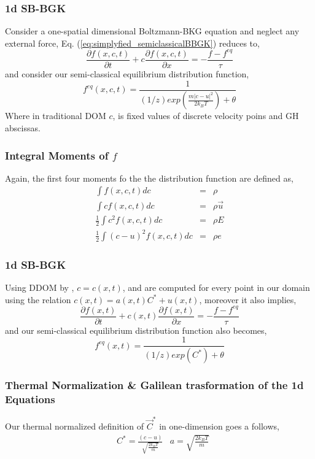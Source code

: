\begin{frame}
	\frametitle{1d SB-BGK}
	Consider a one-spatial dimensional Boltzmann-BKG equation and neglect any external force, Eq. (\ref{eq:simplyfied_semiclassicalBBGK}) reduces to,
	\begin{equation}
	\frac{\partial f(x,c,t)}{\partial t} + c \frac{\partial f(x,c,t)}{\partial x} = -\frac{f - f^{eq}}{\tau}
	\label{eq:sbbgk1d}
	\end{equation}
	and consider our semi-classical equilibrium distribution function,
	\begin{equation}
	f^{eq} (x,c,t) = \frac{1}{(1/z) exp( \frac{ m \left | c - u \right |^2}{2 k_B T} )+\theta}
	\end{equation}
	Where in traditional DOM $c$, is fixed values of discrete velocity poins and GH abscissas.
\end{frame}

\begin{frame}
	\frametitle{Integral Moments of $f$}
	Again, the first four moments fo the the distribution function are defined as,
	\begin{eqnarray}
	\int f(x,c,t) d c  &=& \rho \\
	\int c f(x,c,t) d c  &=& \rho \vec{u} \nonumber \\
	\frac{1}{2} \int c^2 f(x,c,t) d c  &=& \rho E \nonumber \\
	\frac{1}{2} \int (c-u)^2 f(x,c,t) d c  &=& \rho e \nonumber
	\end{eqnarray}
\end{frame}

\begin{frame}
	\frametitle{1d SB-BGK}
	Using DDOM by \cite{Hsu201239}, $c = c(x,t)$, and are computed for every point in our domain using the relation $c(x,t) = a(x,t) C^* + u(x,t)$, moreover it also implies,
	\begin{equation}
	\frac{\partial f(x,t)}{\partial t} + c(x,t) \frac{\partial f(x,t)}{\partial x} = -\frac{f - f^{eq}}{\tau}
	\label{eq:sbbgk1d_DDOM}
	\end{equation}
	and our semi-classical equilibrium distribution function also becomes,
	\begin{equation}
	f^{eq} (x,t) = \frac{1}{(1/z) exp( C^* )+\theta}
	\end{equation}
\end{frame}

\begin{frame}
	\frametitle{Thermal Normalization \& Galilean trasformation of the 1d Equations}
	Our thermal normalized definition of $\vec{C}^*$ in one-dimension goes a follows,
	\begin{align*}
	& C^* = \frac{(c-u)}{\sqrt{\frac{2k_BT}{m}}} & a = \sqrt{\frac{2k_BT}{m}} 
	\end{align*}
\end{frame}
	

